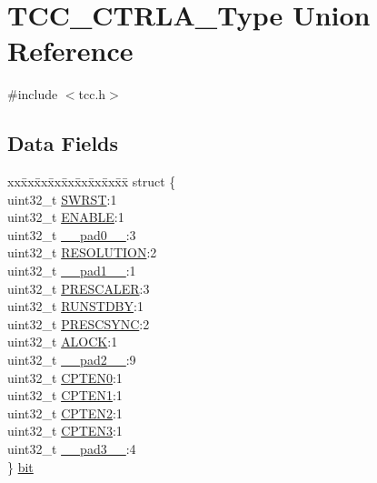 \hypertarget{union_t_c_c___c_t_r_l_a___type}{}\section{T\+C\+C\+\_\+\+C\+T\+R\+L\+A\+\_\+\+Type Union Reference}
\label{union_t_c_c___c_t_r_l_a___type}


{\ttfamily \#include $<$tcc.\+h$>$}

\subsection*{Data Fields}
\begin{DoxyCompactItemize}
\item 
\begin{tabbing}
xx\=xx\=xx\=xx\=xx\=xx\=xx\=xx\=xx\=\kill
struct \{\\
\>uint32\_t \mbox{\hyperlink{union_t_c_c___c_t_r_l_a___type_a34cd956a8da179cbd5fc9060306d420e}{SWRST}}:1\\
\>uint32\_t \mbox{\hyperlink{union_t_c_c___c_t_r_l_a___type_a66f979832c85e0692bd9422b05aff1f7}{ENABLE}}:1\\
\>uint32\_t \mbox{\hyperlink{union_t_c_c___c_t_r_l_a___type_a3e57c2ef1c3ffb36722f000cc1156824}{\_\_pad0\_\_}}:3\\
\>uint32\_t \mbox{\hyperlink{union_t_c_c___c_t_r_l_a___type_a0a893bc33aae967d375478425e200db3}{RESOLUTION}}:2\\
\>uint32\_t \mbox{\hyperlink{union_t_c_c___c_t_r_l_a___type_a6712ba6dd1d5b43d2d56ff8ac4e275a7}{\_\_pad1\_\_}}:1\\
\>uint32\_t \mbox{\hyperlink{union_t_c_c___c_t_r_l_a___type_a6962eb0bc91ab976c33f1d5e1250831f}{PRESCALER}}:3\\
\>uint32\_t \mbox{\hyperlink{union_t_c_c___c_t_r_l_a___type_a5656560aef3eaf5aac89b68b9fe39c3a}{RUNSTDBY}}:1\\
\>uint32\_t \mbox{\hyperlink{union_t_c_c___c_t_r_l_a___type_ac99ea41fb2f58b7b1cdfa047f8270853}{PRESCSYNC}}:2\\
\>uint32\_t \mbox{\hyperlink{union_t_c_c___c_t_r_l_a___type_a450888ed8182c56982b705507f4e6e97}{ALOCK}}:1\\
\>uint32\_t \mbox{\hyperlink{union_t_c_c___c_t_r_l_a___type_a9ce12a63de64ef64ae2d59d128251cae}{\_\_pad2\_\_}}:9\\
\>uint32\_t \mbox{\hyperlink{union_t_c_c___c_t_r_l_a___type_aba62fcdf61c4c2cf302145fa9a13f02c}{CPTEN0}}:1\\
\>uint32\_t \mbox{\hyperlink{union_t_c_c___c_t_r_l_a___type_a42e526e7b67b5e81730bef1716418ee3}{CPTEN1}}:1\\
\>uint32\_t \mbox{\hyperlink{union_t_c_c___c_t_r_l_a___type_a9a2cf3db2ec20e2441693cfc91b1646a}{CPTEN2}}:1\\
\>uint32\_t \mbox{\hyperlink{union_t_c_c___c_t_r_l_a___type_aac094c9c97fc2ab41105932d8b6e480f}{CPTEN3}}:1\\
\>uint32\_t \mbox{\hyperlink{union_t_c_c___c_t_r_l_a___type_a4854608c0e776f0704a4d9a4b98ea57d}{\_\_pad3\_\_}}:4\\
\} \mbox{\hyperlink{union_t_c_c___c_t_r_l_a___type_a658a43c618bbbd052b479f1863d4bf03}{bit}}\\


\end{tabbing}
\end{DoxyCompactItemize}
